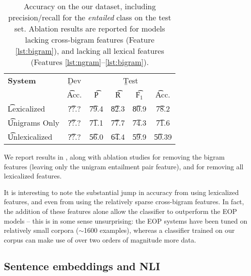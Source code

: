 \begin{table}
\begin{center}
\begin{tabular}{l@{\hskip \colspaceL}c@{\hskip \colspaceL}c@{\hskip \colspaceS}c@{\hskip \colspaceS}c@{\hskip \colspaceM}c}
\hline
\textbf{System} & \b{Dev} & \multicolumn{4}{c}{\b{Test}} \\
 & \t{Acc.} & \t{P} & \t{R} & \t{F$_1$} & \t{Acc.} \\
\hline
\t{Lexicalized}            & \t{??.?} & \t{79.4} & \t{82.3} & \t{80.9} & \t{78.2} \\
\t{Unigrams Only}          & \t{??.?} & \t{71.1} & \t{77.7} & \t{74.3} & \t{71.6} \\
\t{Unlexicalized}          & \t{??.?} & \t{56.0} & \t{64.4} & \t{59.9} & \t{50.39} \\
\hline
\end{tabular}
\end{center}
\caption{
\label{tab:bowresults}
Accuracy on the our dataset, including precision/recall for the
  \textit{entailed} class on the test set.
Ablation results are reported for models lacking cross-bigram features 
  (Feature \ref{lst:bigram}), and lacking all lexical
  features (Features \ref{lst:ngram}--\ref{lst:bigram}).
}
\end{table}
%
%


We report results in , along with ablation studies for removing
  the bigram features (leaving only the unigram entailment pair feature),
  and for removing all lexicalized features.

It is interesting to note the substantial jump in accuracy from using
  lexicalized features, and even from using the relatively sparse
  cross-bigram features.
In fact, the addition of these features alone allow the classifier to
  outperform the EOP models -- this is in some sense unsurprising:
  the EOP systems have been tuned on relatively small corpora
  ($\sim$1600 examples), whereas a classifier trained on our corpus can make use of
  over two orders of magnitude more data.

\subsection{Sentence embeddings and NLI}\label{sentence-embedding}

